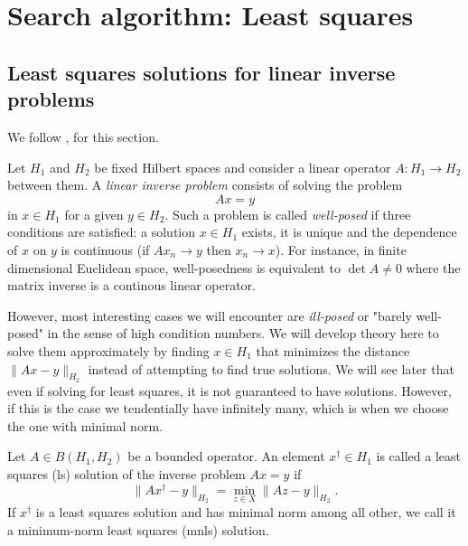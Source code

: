 \chapter{Search algorithm: Least squares}



\section{Least squares solutions for linear inverse problems}

We follow \cite[Chapter 3]{clason}, for this section.

Let $H_1$ and $H_2$ be fixed Hilbert spaces and consider a linear
operator $A \colon H_1 \to H_2$ between them.
A \emph{linear inverse problem} consists of solving the problem
\begin{equation*}
    A x = y
\end{equation*}
in $x \in H_1$ for a given $y \in H_2$.
Such a problem is called \emph{well-posed} if three conditions 
are satisfied:
a solution $x \in H_1$ exists, it is unique and the dependence
of $x$ on $y$ is continuous (if $Ax_n \to y$ then $x_n \to x$).
For instance, in finite dimensional Euclidean space, well-posedness
is equivalent to $\det A \neq 0$ where the matrix inverse is 
a continous linear operator.

However, most interesting cases we will encounter are 
\emph{ill-posed} or "barely well-posed" in the sense of high 
condition numbers.
We will develop theory here to solve them approximately
by finding $x \in H_1$ that minimizes the 
distance $\|Ax - y\|_{H_2}$ instead of attempting to find true 
solutions.
We will see later that even if solving for least squares, 
it is not guaranteed to have solutions.
However, if this is the case we tendentially have infinitely 
many, which is when we choose the one with minimal norm.

\begin{defn}
    Let $A \in B(H_1,H_2)$ be a bounded operator.
    An element $x^\dagger \in H_1$ is called a least squares 
    (ls) solution of the inverse problem $Ax = y$ if 
    \begin{equation*}
        \| Ax^\dagger - y \|_{H_2} 
        = \min_{z \in X} \| A z - y \|_{H_2}.
    \end{equation*}
    If $x^\dagger$ is a least squares solution and has minimal
    norm among all other, we call it a minimum-norm least 
    squares (mnls) solution.
\end{defn}


